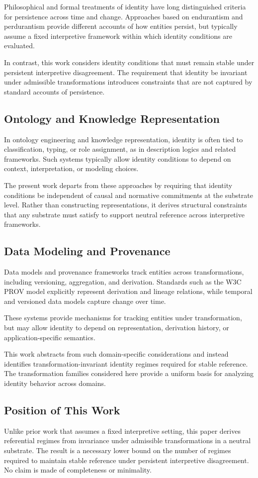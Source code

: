 Philosophical and formal treatments of identity have long distinguished
criteria for persistence across time and change.
Approaches based on endurantism and perdurantism
provide different accounts of how entities persist,
but typically assume a fixed interpretive framework
within which identity conditions are evaluated.

In contrast, this work considers identity conditions that must remain
stable under persistent interpretive disagreement.
The requirement that identity be invariant under admissible transformations
introduces constraints that are not captured by standard accounts
of persistence.

\subsection{Ontology and Knowledge Representation}

In ontology engineering and knowledge representation,
identity is often tied to classification, typing, or role assignment,
as in description logics and related frameworks.
Such systems typically allow identity conditions to depend on
context, interpretation, or modeling choices.

The present work departs from these approaches by requiring that
identity conditions be independent of causal and normative commitments
at the substrate level.
Rather than constructing representations,
it derives structural constraints that any substrate must satisfy
to support neutral reference across interpretive frameworks.

\subsection{Data Modeling and Provenance}

Data models and provenance frameworks track entities across transformations,
including versioning, aggregation, and derivation.
Standards such as the W3C PROV model explicitly represent derivation
and lineage relations, while temporal and versioned data models
capture change over time.

These systems provide mechanisms for tracking entities under transformation,
but may allow identity to depend on representation,
derivation history, or application-specific semantics.

This work abstracts from such domain-specific considerations
and instead identifies transformation-invariant identity regimes
required for stable reference.
The transformation families considered here provide a uniform basis
for analyzing identity behavior across domains.

\subsection{Position of This Work}

Unlike prior work that assumes a fixed interpretive setting,
this paper derives referential regimes from
invariance under admissible transformations in a neutral substrate.
The result is a necessary lower bound on the number of regimes required
to maintain stable reference under persistent interpretive disagreement.
No claim is made of completeness or minimality.
